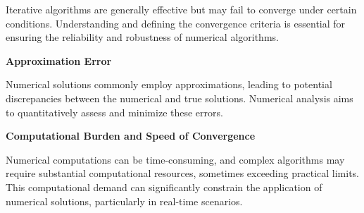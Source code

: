 Iterative algorithms are generally effective but may fail to converge under certain conditions. Understanding and defining the convergence criteria is essential for ensuring the reliability and robustness of numerical algorithms.

\vspace{0.1in}
\noindent \textbf{Approximation Error}
\vspace{0.1in}

Numerical solutions commonly employ approximations, leading to potential discrepancies between the numerical and true solutions. Numerical analysis aims to quantitatively assess and minimize these errors.

\vspace{0.1in}
\noindent \textbf{Computational Burden and Speed of Convergence}
\vspace{0.1in}

Numerical computations can be time-consuming, and complex algorithms may require substantial computational resources, sometimes exceeding practical limits. This computational demand can significantly constrain the application of numerical solutions, particularly in real-time scenarios.


